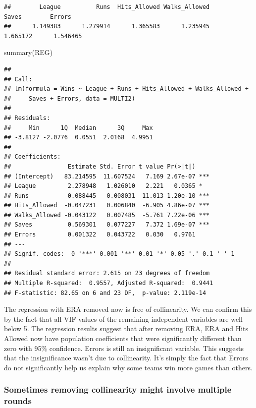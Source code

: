 \documentclass[
]{book}
\newenvironment{Shaded}{\begin{snugshade}}{\end{snugshade}}
\newcommand{\FunctionTok}[1]{\textcolor[rgb]{0.00,0.00,0.00}{#1}}
\newcommand{\NormalTok}[1]{#1}
\begin{document}
\begin{verbatim}
##        League          Runs  Hits_Allowed Walks_Allowed         Saves        Errors 
##      1.149383      1.279914      1.365583      1.235945      1.665172      1.546465
\end{verbatim}

\begin{Shaded}
\begin{Highlighting}[]
\FunctionTok{summary}\NormalTok{(REG)}
\end{Highlighting}
\end{Shaded}

\begin{verbatim}
## 
## Call:
## lm(formula = Wins ~ League + Runs + Hits_Allowed + Walks_Allowed + 
##     Saves + Errors, data = MULTI2)
## 
## Residuals:
##     Min      1Q  Median      3Q     Max 
## -3.8127 -2.0776  0.0551  2.0168  4.9951 
## 
## Coefficients:
##                Estimate Std. Error t value Pr(>|t|)    
## (Intercept)   83.214595  11.607524   7.169 2.67e-07 ***
## League         2.278948   1.026010   2.221   0.0365 *  
## Runs           0.088445   0.008031  11.013 1.20e-10 ***
## Hits_Allowed  -0.047231   0.006840  -6.905 4.86e-07 ***
## Walks_Allowed -0.043122   0.007485  -5.761 7.22e-06 ***
## Saves          0.569301   0.077227   7.372 1.69e-07 ***
## Errors         0.001322   0.043722   0.030   0.9761    
## ---
## Signif. codes:  0 '***' 0.001 '**' 0.01 '*' 0.05 '.' 0.1 ' ' 1
## 
## Residual standard error: 2.615 on 23 degrees of freedom
## Multiple R-squared:  0.9557, Adjusted R-squared:  0.9441 
## F-statistic: 82.65 on 6 and 23 DF,  p-value: 2.119e-14
\end{verbatim}

The regression with ERA removed now is free of collinearity. We can confirm this by the fact that all VIF values of the remaining independent variables are well below 5. The regression results suggest that after removing ERA, ERA and Hits Allowed now have population coefficients that were significantly different than zero with 95\% confidence. Errors is still an insignificant variable. This suggests that the insignificance wasn't due to collinearity. It's simply the fact that Errors do not significantly help us explain why some teams win more games than others.

\hypertarget{sometimes-removing-collinearity-might-involve-multiple-rounds}{%
\subsubsection*{Sometimes removing collinearity might involve multiple rounds}\label{sometimes-removing-collinearity-might-involve-multiple-rounds}}
\end{document}
